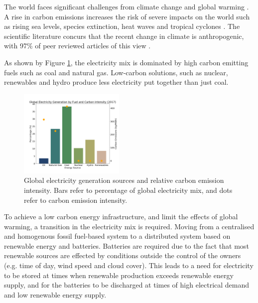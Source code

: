 
The world faces significant challenges from climate change and global warming \cite{Masson-Delmotte2018}. A rise in carbon emissions increases the risk of severe impacts on the world such as rising sea levels, species extinction, heat waves and tropical cyclones \cite{IPCC2014}. The scientific literature concurs that the recent change in climate is anthropogenic, with 97\% of peer reviewed articles of this view \cite{Cook2013}.  

As shown by Figure \ref{fig:fuel_emissions_market_share}, the electricity mix is dominated by high carbon emitting fuels such as coal and natural gas. Low-carbon solutions, such as nuclear, renewables and hydro  produce less electricity put together than just coal.



\begin{figure}[b]
	\begin{center}
		\includegraphics[width=0.45\textwidth]{figures/elec_gen_carbon.png}
		\caption{Global electricity generation sources and relative carbon emission intensity. Bars refer to percentage of global electricity mix, and dots refer to carbon emission intensity. ~\cite{BP2018,Hall1983}}
		\label{fig:fuel_emissions_market_share}
	\end{center}
\end{figure}


To achieve a low carbon energy infrastructure, and limit the effects of global warming, a transition in the electricity mix is required. Moving from a centralised and homogenous fossil fuel-based system to a distributed system based on renewable energy and batteries. Batteries are required due to the fact that most renewable sources are effected by conditions outside the control of the owners (e.g. time of day, wind speed and cloud cover). This leads to a need for electricity to be stored at times when renewable production exceeds renewable energy supply, and for the batteries to be discharged at times of high electrical demand and low renewable energy supply. 

